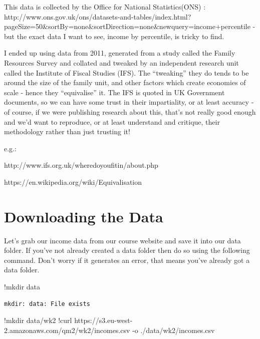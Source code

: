 \documentclass[
  letterpaper,
  DIV=11,
  numbers=noendperiod]{scrreprt}
\newenvironment{Shaded}{\begin{snugshade}}{\end{snugshade}}
\newcommand{\ErrorTok}[1]{\textcolor[rgb]{0.68,0.00,0.00}{#1}}
\newcommand{\FloatTok}[1]{\textcolor[rgb]{0.68,0.00,0.00}{#1}}
\newcommand{\NormalTok}[1]{\textcolor[rgb]{0.00,0.23,0.31}{#1}}
\newcommand{\OperatorTok}[1]{\textcolor[rgb]{0.37,0.37,0.37}{#1}}
\begin{document}
This data is collected by the Office for National Statistics(ONS) :
http://www.ons.gov.uk/ons/datasets-and-tables/index.html?pageSize=50\&sortBy=none\&sortDirection=none\&newquery=income+percentile
- but the exact data I want to see, income by percentile, is tricky to
find.

I ended up using data from 2011, generated from a study called the
Family Resources Survey and collated and tweaked by an independent
research unit called the Institute of Fiscal Studies (IFS). The
``tweaking'' they do tends to be around the size of the family unit, and
other factors which create economies of scale - hence they
``equivalise'' it. The IFS is quoted in UK Government documents, so we
can have some trust in their impartiality, or at least accuracy - of
course, if we were publishing research about this, that's not really
good enough and we'd want to reproduce, or at least understand and
critique, their methodology rather than just trusting it!

e.g.:

http://www.ifs.org.uk/wheredoyoufitin/about.php

https://en.wikipedia.org/wiki/Equivalisation

\hypertarget{downloading-the-data}{%
\section{Downloading the Data}\label{downloading-the-data}}

Let's grab our income data from our course website and save it into our
data folder. If you've not already created a data folder then do so
using the following command. Don't worry if it generates an error, that
means you've already got a data folder.

\begin{Shaded}
\begin{Highlighting}[]
\OperatorTok{!}\NormalTok{mkdir data}
\end{Highlighting}
\end{Shaded}

\begin{verbatim}
mkdir: data: File exists
\end{verbatim}

\begin{Shaded}
\begin{Highlighting}[]
\OperatorTok{!}\NormalTok{mkdir data}\OperatorTok{/}\NormalTok{wk2}
\OperatorTok{!}\NormalTok{curl https:}\OperatorTok{//}\NormalTok{s3.eu}\OperatorTok{{-}}\NormalTok{west}\OperatorTok{{-}}\FloatTok{2.}\ErrorTok{amazonaws}\NormalTok{.com}\OperatorTok{/}\NormalTok{qm2}\OperatorTok{/}\NormalTok{wk2}\OperatorTok{/}\NormalTok{incomes.csv }\OperatorTok{{-}}\NormalTok{o .}\OperatorTok{/}\NormalTok{data}\OperatorTok{/}\NormalTok{wk2}\OperatorTok{/}\NormalTok{incomes.csv}
\end{Highlighting}
\end{Shaded}
\end{document}
